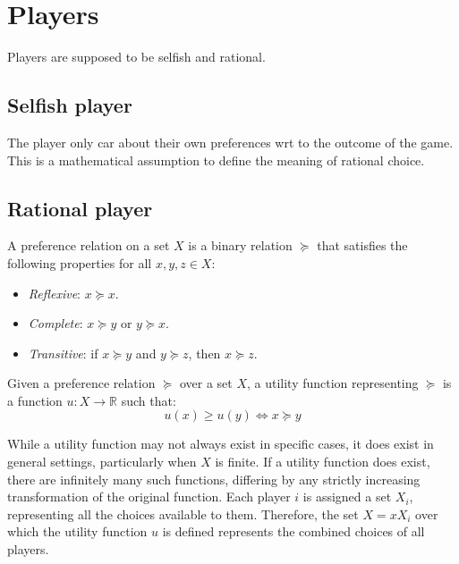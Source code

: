 \section{Players}

Players are supposed to be selfish and rational. 

\subsection{Selfish player}
The player only car about their own preferences wrt to the outcome of the game. 
This is a mathematical assumption to define the meaning of rational choice. 

\subsection{Rational player}
\begin{definition}
    A preference relation on a set $X$ is a binary relation $\succeq$ that satisfies the following properties for all $x,y,z\in X$: 
    \begin{itemize}
        \item \textit{Reflexive}: $x \succeq x$.
        \item \textit{Complete}: $x \succeq y$ or $y \succeq x$.
        \item \textit{Transitive}: if $x \succeq y$ and $y \succeq z$, then $x \succeq z$.
    \end{itemize}
\end{definition}

\begin{definition}
    Given a preference relation $\succeq$ over a set $X$, a utility function representing $\succeq$ is a function $u:X\rightarrow\mathbb{R}$ such that: 
    \[u(x)\geq u(y)\Leftrightarrow x \succeq y\]
\end{definition}
\noindent While a utility function may not always exist in specific cases, it does exist in general settings, particularly when $X$ is finite.
If a utility function does exist, there are infinitely many such functions, differing by any strictly increasing transformation of the original function.
Each player $i$ is assigned a set $X_i$, representing all the choices available to them.
Therefore, the set $X=xX_i$ over which the utility function $u$ is defined represents the combined choices of all players.

